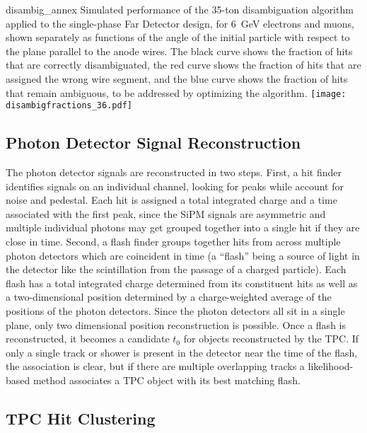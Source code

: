 \begin{cdrfigure}{disambig_annex}
{Simulated performance of the 35-ton disambiguation algorithm applied to the single-phase Far Detector
design, for 6~GeV electrons and muons, shown separately as functions of the angle of the initial particle
with respect to the plane parallel to the anode wires.  The black curve shows the fraction of hits that
are correctly disambiguated, the red curve shows the fraction of hits that are assigned the wrong wire segment,
and the blue curve shows the fraction of hits that remain ambiguous, to be addressed by optimizing the algorithm.}
\texttt{[image: disambigfractions\_36.pdf]}
\end{cdrfigure}

\subsection{Photon Detector Signal Reconstruction}

The photon detector signals are reconstructed in two steps.  First, a
hit finder identifies signals on an individual channel, looking for
peaks while account for noise and pedestal.  Each hit is assigned a
total integrated charge and a time associated with the first peak,
since the SiPM signals are asymmetric and multiple individual photons
may get grouped together into a single hit if they are close in time.
Second, a flash finder groups together hits from across multiple
photon detectors which are coincident in time (a ``flash'' being a
source of light in the detector like the scintillation from the
passage of a charged particle).  Each flash has a total integrated
charge determined from its constituent hits as well as a
two-dimensional position determined by a charge-weighted average of
the positions of the photon detectors.  Since the photon detectors all
sit in a single plane, only two dimensional position reconstruction is
possible.  Once a flash is reconstructed, it becomes a candidate $t_0$
for objects reconstructed by the TPC.  If only a single track or
shower is present in the detector near the time of the flash, the
association is clear, but if there are multiple overlapping tracks a
likelihood-based method associates a TPC object with its best matching
flash.


\subsection{TPC Hit Clustering}

